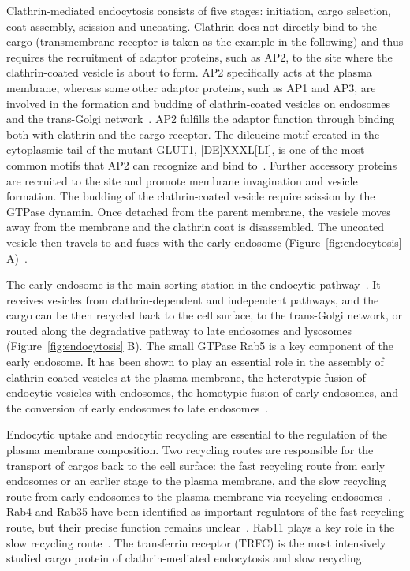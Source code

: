 Clathrin-mediated endocytosis consists of five stages: initiation, cargo selection, coat assembly, scission and uncoating. Clathrin does not directly bind to the cargo (transmembrane receptor is taken as the example in the following) and thus requires the recruitment of adaptor proteins, such as AP2, to the site where the clathrin-coated vesicle is about to form. AP2 specifically acts at the plasma membrane, whereas some other adaptor proteins, such as AP1 and AP3, are involved in the formation and budding of clathrin-coated vesicles on endosomes and the trans-Golgi network~\cite{Hirst2,McMahon}. AP2 fulfills the adaptor function through binding both with clathrin and the cargo receptor. The dileucine motif created in the cytoplasmic tail of the mutant GLUT1, [DE]XXXL[LI], is one of the most common motifs that AP2 can recognize and bind to~\cite{Humphries}. Further accessory proteins are recruited to the site and promote membrane invagination and vesicle formation. The budding of the clathrin-coated vesicle require scission by the GTPase dynamin. Once detached from the parent membrane, the vesicle moves away from the membrane and the clathrin coat is disassembled. The uncoated vesicle then travels to and fuses with the early endosome (Figure~\ref{fig:endocytosis} A)~\cite{McMahon}.

The early endosome is the main sorting station in the endocytic pathway~\cite{Huotari}. It receives vesicles from clathrin-dependent and independent pathways, and the cargo can be then recycled back to the cell surface, to the trans-Golgi network, or routed along the degradative pathway to late endosomes and lysosomes (Figure~\ref{fig:endocytosis} B). The small GTPase Rab5 is a key component of the early endosome. It has been shown to play an essential role in the assembly of clathrin-coated vesicles at the plasma membrane, the heterotypic fusion of endocytic vesicles with endosomes, the homotypic fusion of early endosomes, and the conversion of early endosomes to late endosomes~\cite{Stenmark,Huotari}. 

Endocytic uptake and endocytic recycling are essential to the regulation of the plasma membrane composition. Two recycling routes are responsible for the transport of cargos back to the cell surface: the fast recycling route from early endosomes or an earlier stage to the plasma membrane, and the slow recycling route from early endosomes to the plasma membrane via recycling endosomes~\cite{Grant}. Rab4 and Rab35 have been identified as important regulators of the fast recycling route, but their precise function remains unclear~\cite{Grant}. Rab11 plays a key role in the slow recycling route~\cite{Grant}. The transferrin receptor (TRFC) is the most intensively studied cargo protein of clathrin-mediated endocytosis and slow recycling. 

